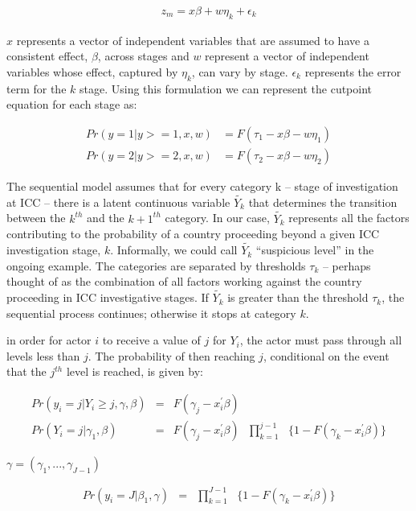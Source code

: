 \begin{align}
	z_{m} = x \beta + w\eta_{k}  + \epsilon_{k}	
\end{align}

$x$ represents a vector of independent variables that are assumed to have a consistent effect, $\beta$, across stages and $w$ represent a vector of independent variables whose effect, captured by $\eta_{k}$, can vary by stage. $\epsilon_{k}$ represents the error term for the $k$ stage. Using this formulation we can represent the cutpoint equation for each stage as: 

\begin{align}
	Pr(y = 1 | y >= 1, x, w) &= F(\tau_{1} - x\beta - w\eta_{1}) \\
	Pr(y = 2 | y >= 2, x, w) &= F(\tau_{2} - x\beta - w\eta_{2})
\end{align}

The sequential model assumes that for every category k -- stage of investigation at ICC -- there is a latent continuous variable $\tilde{Y_{k}}$ that determines the transition between the $k^{th}$ and the $k+1^{th}$ category. In our case, $\tilde{Y_{k}}$ represents all the factors contributing to the probability of a country proceeding beyond a given ICC investigation stage, $k$. Informally, we could call $\tilde{Y_{k}}$ ``suspicious level'' in the ongoing example. The categories are separated by thresholds $\tau_{k}$ -- perhaps thought of as the combination of all factors working against the country proceeding in ICC investigative stages. If $\tilde{Y_{k}}$ is greater than the threshold $\tau_{k}$, the sequential process continues; otherwise it stops at category $k$. 

in order for actor $i$ to receive a value of $j$ for $Y_{i}$, the actor must pass through all levels less than $j$. The probability of then reaching $j$, conditional on the event that the $j^{th}$ level is reached, is given by:

\begin{eqnarray}
	Pr(y_{i}={j} | Y_{i} \geq {j}, \gamma, \beta) &=& F(\gamma_{j} - x_{i}^{'}\beta) \nonumber \\
	Pr(Y_{i}={j}|\gamma_{1},\beta) &=& F(\gamma_{j} - x_{i}^{'}\beta)\text{ }\prod^{j-1}_{k=1}\text{ }\{1-F(\gamma_{k}-x_{i}^{'}\beta)\} \nonumber
\end{eqnarray}

$\gamma = (\gamma_{1},...,\gamma_{J-1})$

\begin{eqnarray}
	Pr(y_{i}=J|\beta_{1},\gamma) &=&\text{}\prod^{J-1}_{k=1}\text{ }\{1-F(\gamma_{k}-x_{i}^{'}\beta)\} \nonumber
\end{eqnarray}

